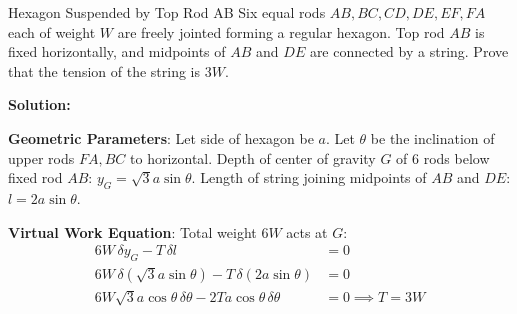 \begin{examplebox}{Hexagon Suspended by Top Rod AB}
Six equal rods $AB, BC, CD, DE, EF, FA$ each of weight $W$ are freely jointed forming a regular hexagon. Top rod $AB$ is fixed horizontally, and midpoints of $AB$ and $DE$ are connected by a string. Prove that the tension of the string is $3W$.

\tcblower
\textbf{Solution:}


\textbf{Geometric Parameters}:
    Let side of hexagon be $a$. Let $\theta$ be the inclination of upper rods $FA, BC$ to horizontal.
    Depth of center of gravity $G$ of 6 rods below fixed rod $AB$: $y_G = \sqrt{3}a \sin\theta$.
    Length of string joining midpoints of $AB$ and $DE$: $l = 2a \sin\theta$.

\textbf{Virtual Work Equation}:
    Total weight $6W$ acts at $G$:
    \begin{align*}
        6W \, \delta y_G - T \, \delta l &= 0 \\
        6W \, \delta (\sqrt{3}a \sin\theta) - T \, \delta(2a \sin\theta) &= 0 \\
        6W \sqrt{3}a \cos\theta \, \delta\theta - 2T a \cos\theta \, \delta\theta &= 0 \implies T = 3W
    \end{align*}
\end{examplebox}

